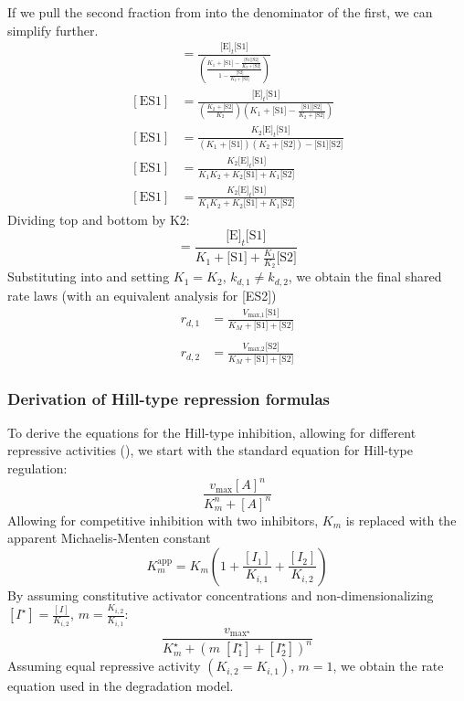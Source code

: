 If we pull the second fraction from  into the denominator of the first, we can simplify further.
\begin{align*}
  [\text{ES1}] &= \frac{\text{[E]}_t \text{[S1]}}{\left(\frac{K_1 + \text{[S1]} - \frac{\text{[S1]} \text{[S2]}}{K_2 + \text{[S2]}}}{1 - \frac{\text{[S2]}}{K_2 + \text{[S2]}}}\right)} \\
  [\text{ES1}] &= \frac{\text{[E]}_t \text{[S1]}}{\left(\frac{K_2 + \text{[S2]}}{K_2}\right) \left(K_1 + \text{[S1]} - \frac{\text{[S1]} \text{[S2]}}{K_2 + \text{[S2]}}\right)} \\
  [\text{ES1}] &= \frac{K_2 \text{[E]}_t \text{[S1]}}{(K_1 + \text{[S1]})(K_2 + \text{[S2]}) - \text{[S1]}\text{[S2]}} \\
  [\text{ES1}] &= \frac{K_2 \text{[E]}_t \text{[S1]}}{K_1 K_2 + K_2\text{[S1]} + K_1\text{[S2]}} \\
  [\text{ES1}] &= \frac{K_2 \text{[E]}_t \text{[S1]}}{K_1 K_2 + K_2\text{[S1]} + K_1\text{[S2]}}
\end{align*}
Dividing top and bottom by K2:
\begin{equation}
[\text{ES1}] = \frac{\text{[E]}_t \text{[S1]}}{K_1 + \text{[S1]} + \frac{K_1}{K_2}\text{[S2]}}\label{eq:es1}
\end{equation}
Substituting  into  and setting $K_1 = K_2$, $k_{d,1} \neq k_{d,2}$, we obtain the final shared rate laws (with an equivalent analysis for [ES2])
\begin{align*}
  r_{d,1} &= \frac{V_\text{max,1} \text{[S1]}}{K_M + \text{[S1]} + \text{[S2]}} \\ \\
  r_{d,2} &= \frac{V_\text{max,2} \text{[S2]}}{K_M + \text{[S1]} + \text{[S2]}}
\end{align*}

\subsubsection{Derivation of Hill-type repression formulas}
To derive the equations for the Hill-type inhibition, allowing for different repressive activities (), we start with the standard equation for Hill-type regulation:
\begin{equation} \label{eq:htr}
  \frac{v_{\text{max}}[A]^n}{K_m^n + [A]^n}
\end{equation}
Allowing for competitive inhibition with two inhibitors, $K_m$ is replaced with the apparent Michaelis-Menten constant
\begin{equation}\label{eq:kmapp}
  K_m^{\text{app}} = K_m \left(1 + \frac{[I_1]}{K_{i,1}} + \frac{[I_2]}{K_{i,2}}\right)
\end{equation}
By assuming constitutive activator concentrations and non-dimensionalizing $[I^{\star}] = \frac{[I]}{K_{i,2}}$, $m = \frac{K_{i,2}}{K_{i,1}}$:
\begin{equation*}
  \frac{v_{\text{max}^{\star}}}{K_m^{\star} + \left(m \; [I^{\star}_1] + [I^{\star}_2]\right)^n}
\end{equation*}
Assuming equal repressive activity $(K_{i,2} = K_{i,1})$, $m = 1$, we obtain the rate equation used in the degradation model.


